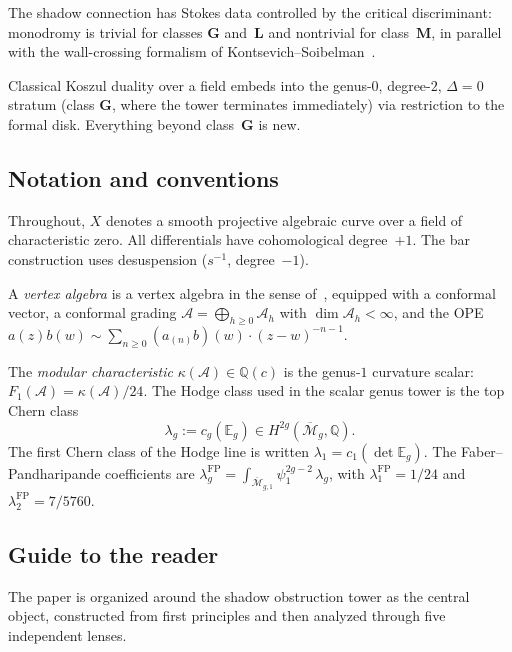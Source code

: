\documentclass[11pt,reqno]{amsart}
\theoremstyle{definition}
\theoremstyle{remark}
\newcommand{\cA}{\mathcal{A}}
\newcommand{\Mbar}{\overline{\mathcal{M}}}
\numberwithin{equation}{section}
\begin{document}
The shadow connection has Stokes data controlled by the
critical discriminant: monodromy is trivial for classes
$\mathbf{G}$ and~$\mathbf{L}$ and nontrivial for
class~$\mathbf{M}$, in parallel with the wall-crossing
formalism of
Kontsevich--Soibelman~\cite{KontsevichSoibelman}.

Classical Koszul duality over a field embeds into the
genus-$0$, degree-$2$, $\Delta = 0$ stratum (class
$\mathbf{G}$, where the tower terminates immediately)
via restriction to the formal disk.
Everything beyond class~$\mathbf{G}$ is new.

\subsection{Notation and conventions}\label{subsec:notation}

Throughout, $X$ denotes a smooth projective algebraic curve
over a field of characteristic zero. All differentials have
cohomological degree~$+1$. The bar construction uses
desuspension ($s^{-1}$, degree~$-1$).

A \emph{vertex algebra} is a vertex algebra in the sense
of~\cite{FrenkelBenZvi, Kac-vertex}, equipped with a
conformal vector, a conformal grading
$\cA = \bigoplus_{h \ge 0} \cA_h$ with
$\dim \cA_h < \infty$, and the OPE
$a(z)b(w) \sim \sum_{n \ge 0} (a_{(n)}b)(w) \cdot
(z-w)^{-n-1}$.

The \emph{modular characteristic}
$\kappa(\cA) \in \mathbb{Q}(c)$ is the genus-$1$ curvature
scalar: $F_1(\cA) = \kappa(\cA)/24$. The Hodge class used in the
scalar genus tower is the top Chern class
\[
\lambda_g := c_g(\mathbb{E}_g) \in H^{2g}(\Mbar_g,\mathbb{Q}).
\]
The first Chern class of the Hodge line is written
\(\lambda_1=c_1(\det\mathbb E_g)\).
The Faber--Pandharipande coefficients are
$\lambda_g^{\mathrm{FP}} =
\int_{\Mbar_{g,1}} \psi_1^{2g-2}\, \lambda_g$, with
$\lambda_1^{\mathrm{FP}} = 1/24$ and
$\lambda_2^{\mathrm{FP}} = 7/5760$.

\subsection{Guide to the reader}\label{subsec:guide}

The paper is organized around the shadow obstruction tower
as the central object, constructed from first principles and
then analyzed through five independent lenses.
\end{document}
